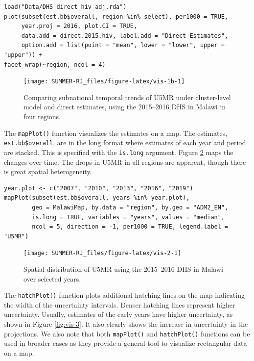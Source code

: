 \begin{verbatim}
load("Data/DHS_direct_hiv_adj.rda")
plot(subset(est.bb$overall, region %in% select), per1000 = TRUE, 
     year.proj = 2016, plot.CI = TRUE,
     data.add = direct.2015.hiv, label.add = "Direct Estimates", 
     option.add = list(point = "mean", lower = "lower", upper = "upper")) + 
facet_wrap(~region, ncol = 4)
\end{verbatim}

\begin{figure}[!ht]

{\centering \texttt{[image: SUMMER-RJ\_files/figure-latex/vis-1b-1]} 

}

\caption{Comparing subnational temporal trends of U5MR under cluster-level model and direct estimates, using the 2015--2016 DHS in Malawi in four regions.}\label{fig:vis-1b}
\end{figure}

The \texttt{mapPlot()} function visualizes the estimates on a map. The estimates, \texttt{est.bb\$overall}, are in the long format where estimates of each year and period are stacked. This is specified with the \texttt{is.long} argument. Figure \ref{fig:vis-2} maps the changes over time. The drops in U5MR in all regions are apparent, though there is great spatial heterogeneity.

\begin{verbatim}
year.plot <- c("2007", "2010", "2013", "2016", "2019")
mapPlot(subset(est.bb$overall, years %in% year.plot), 
        geo = MalawiMap, by.data = "region", by.geo = "ADM2_EN", 
        is.long = TRUE, variables = "years", values = "median", 
        ncol = 5, direction = -1, per1000 = TRUE, legend.label = "U5MR")
\end{verbatim}

\begin{figure}[!ht]
\texttt{[image: SUMMER-RJ\_files/figure-latex/vis-2-1]} \caption{Spatial distribution of U5MR using the 2015--2016 DHS in Malawi over selected years.}\label{fig:vis-2}
\end{figure}

The \texttt{hatchPlot()} function plots additional hatching lines on the map indicating the width of the uncertainty intervals. Denser hatching lines represent higher uncertainty. Usually, estimates of the early years have higher uncertainty, as shown in Figure \ref{fig:vis-3}. It also clearly shows the increase in uncertainty in the projections. We also note that both \texttt{mapPlot()} and \texttt{hatchPlot()} functions can be used in broader cases as they provide a general tool to visualize rectangular data on a map.

